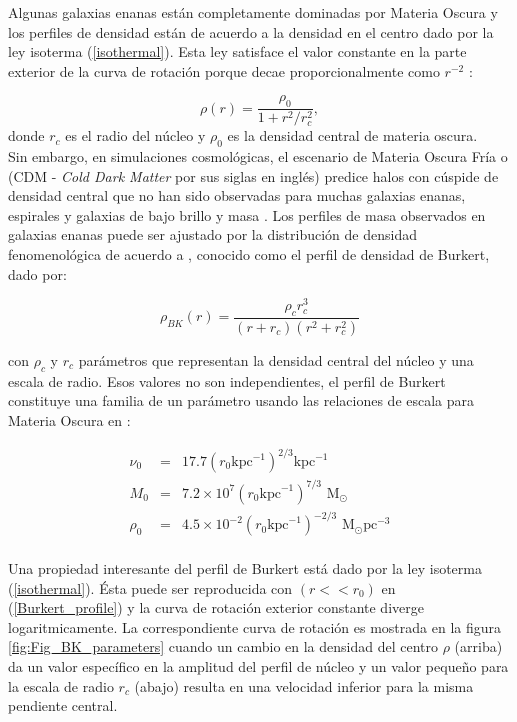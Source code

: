 Algunas galaxias enanas  están completamente dominadas por Materia Oscura y los perfiles de densidad están de acuerdo a la densidad en el centro dado por la ley isoterma (\ref{isothermal}). Esta ley satisface el valor constante  en la parte exterior de la curva de rotación porque decae proporcionalmente como $r^{-2}$ \cite{Burkert95}:

\begin{equation}
\label{isothermal}
\rho(r) =	\frac{\rho_0}{1+r^2/r_c^2},
\end{equation}
donde $r_c$ es el radio del núcleo y  $\rho_0$ es la densidad central de materia oscura.\\

Sin embargo, en simulaciones cosmológicas, el escenario de Materia Oscura Fría o (CDM - \emph{Cold Dark Matter} por sus siglas en inglés) predice halos con cúspide de densidad central que no han sido observadas para muchas galaxias enanas, espirales y galaxias de bajo brillo y masa \cite{L17}. Los perfiles de masa observados en galaxias enanas puede ser ajustado por la distribución de densidad fenomenológica de acuerdo a \cite{Burkert95}, conocido como el perfil de densidad de Burkert, dado por:

\begin{equation}
\label{Burkert_profile}
\rho_{BK}(r) = \frac{\rho_c r_c^{3}}{(r+r_c)(r^2+r_c^2)}
\end{equation}

con $\rho_c$ y $r_c$ parámetros que representan la densidad central del núcleo y una escala de radio. Esos valores no son independientes, el perfil de Burkert constituye una familia de un parámetro \cite{S00} usando las relaciones de escala para Materia Oscura en  \cite{Burkert95}:

\begin{eqnarray*}
\nu_0 &=& 17.7 (r_0 \textrm{kpc}^{-1})^{2/3} \textrm{kpc}^{-1}  \\
M_0 &=& 7.2 \times 10^{7} (r_0 \textrm{kpc}^{-1})^{7/3} \textrm{ M}_{\odot}\\
\rho_{0} &=& 4.5 \times 10^{-2} (r_0 \textrm{kpc}^{-1})^{-2/3} \textrm{ M}_{\odot} \textrm{pc}^{-3} \\
\end{eqnarray*}

Una propiedad interesante del perfil de Burkert está dado por la ley isoterma (\ref{isothermal}). Ésta puede ser reproducida con $(r<<r_0)$ en (\ref{Burkert_profile}) y la curva de rotación exterior constante diverge logaritmicamente. La correspondiente curva de rotación es mostrada en la figura \ref{fig:Fig_BK_parameters} cuando un cambio en la densidad del centro $\rho$ (arriba) da un valor específico en la amplitud del perfil de núcleo y un valor pequeño para la escala de radio $r_c$ (abajo)  resulta en una velocidad inferior para la misma pendiente central.

